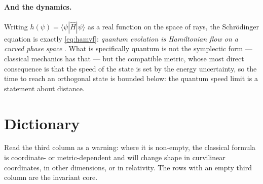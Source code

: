\documentclass[10pt,a4paper]{article}
\theoremstyle{plain}
\theoremstyle{definition}
\numberwithin{equation}{section}
\begin{document}
\paragraph{And the dynamics.} Writing $h(\psi)=\langle\psi|\hat H|\psi\rangle$ as a real
function on the space of rays, the Schr\"odinger equation is exactly \eqref{eq:hamvf}:
\emph{quantum evolution is Hamiltonian flow on a curved phase space}
\cite{AshtekarSchilling}. What is specifically quantum is not the symplectic form --- classical
mechanics has that --- but the compatible metric, whose most direct consequence is that the
speed of the state is set by the energy uncertainty, so the time to reach an orthogonal state is
bounded below: the quantum speed limit is a statement about distance.


\clearpage
\section{Dictionary}
\label{sec:dict}

Read the third column as a warning: where it is non-empty, the classical formula is
coordinate- or metric-dependent and will change shape in curvilinear coordinates, in other
dimensions, or in relativity. The rows with an empty third column are the invariant core.
\end{document}
